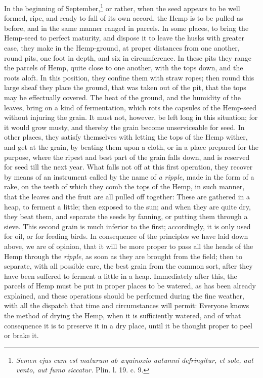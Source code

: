 \documentclass[a4paper, 11pt, oneside, polutonikogreek, english]{article}
\begin{document}
In the beginning of September,\footnote{\emph{Semen ejus cum est maturum ab æquinoxio autumni defringitur, et sole, aut vento, aut fumo siccatur.} Plin. l. 19. c. 9.} or rather, when the seed appears to be well formed, ripe, and ready to fall of its own accord, the Hemp is to be pulled as before, and in the same manner ranged in parcels. In some places, to bring the Hemp-seed to perfect maturity, and dispose it to leave the husks with greater ease, they make in the Hemp-ground, at proper distances from one another, round pits, one foot in depth, and six in circumference. In these pits they range the parcels of Hemp, quite close to one another, with the tops down, and the roots aloft. In this position, they confine them with straw ropes; then round this large sheaf they place the ground, that was taken out of the pit, that the tops may be effectually covered. The heat of the ground, and the humidity of the leaves, bring on a kind of fermentation, which rots the capsules of the Hemp-seed without injuring the grain. It must not, however, be left long in this situation; for it would grow musty, and thereby the grain become unserviceable for seed. In other places, they satisfy themselves with letting the tops of the Hemp wither, and get at the grain, by beating them upon a cloth, or in a place prepared for the purpose, where the ripest and best part of the grain falls down, and is reserved for seed till the next year. What falls not off at this first operation, they recover by means of an instrument called by the name of \emph{a ripple}, made in the form of a rake, on the teeth of which they comb the tops of the Hemp, in such manner, that the leaves and the fruit are all pulled off together: These are gathered in a heap, to ferment a little; then exposed to the sun; and when they are quite dry, they beat them, and separate the seeds by fanning, or putting them through a sieve. This second grain is much inferior to the first; accordingly, it is only used for oil, or for feeding birds. In consequence of the principles we have laid down above, we are of opinion, that it will be more proper to pass all the heads of the Hemp through the \emph{ripple}, as soon as they are brought from the field; then to separate, with all possible care, the best grain from the common sort, after they have been suffered to ferment a little in a heap. Immediately after this, the parcels of Hemp must be put in proper places to be watered, as has been already explained, and these operations should be performed during the fine weather, with all the dispatch that time and circumstances will permit: Everyone knows the method of drying the Hemp, when it is sufficiently watered, and of what consequence it is to preserve it in a dry place, until it be thought proper to peel or brake it.
\end{document}
